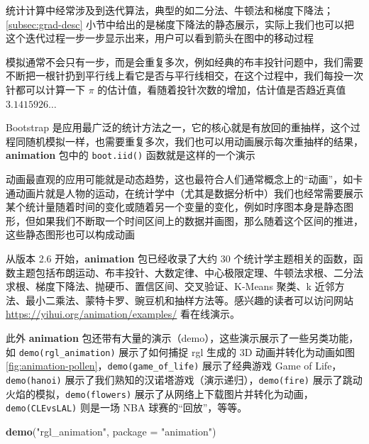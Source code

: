 \documentclass[
  b5paper,
  UTF8,twoside]{book}
\newenvironment{Shaded}{\begin{snugshade}}{\end{snugshade}}
\newcommand{\AttributeTok}[1]{\textcolor[rgb]{0.13,0.29,0.53}{#1}}
\newcommand{\FunctionTok}[1]{\textcolor[rgb]{0.13,0.29,0.53}{\textbf{#1}}}
\newcommand{\NormalTok}[1]{#1}
\newcommand{\StringTok}[1]{\textcolor[rgb]{0.31,0.60,0.02}{#1}}
\providecommand{\tightlist}{%
  \setlength{\itemsep}{0pt}\setlength{\parskip}{0pt}}
\begin{document}
\begin{description}
\tightlist
\item[迭代算法]
统计计算中经常涉及到迭代算法，典型的如二分法、牛顿法和梯度下降法；\ref{subsec:grad-desc} 小节中给出的是梯度下降法的静态展示，实际上我们也可以把这个迭代过程一步一步显示出来，用户可以看到箭头在图中的移动过程
\item[随机模拟]
模拟通常不会只有一步，而是会重复多次，例如经典的布丰投针问题中，我们需要不断把一根针扔到平行线上看它是否与平行线相交，在这个过程中，我们每投一次针都可以计算一下 \(\pi\) 的估计值，看随着投针次数的增加，估计值是否趋近真值 \(3.1415926\ldots\)
\item[重抽样]
Bootstrap 是应用最广泛的统计方法之一，它的核心就是有放回的重抽样，这个过程同随机模拟一样，也需要重复多次，我们也可以用动画展示每次重抽样的结果，\textbf{animation} 包中的 \texttt{boot.iid()} 函数就是这样的一个演示
\item[动态趋势]
动画最直观的应用可能就是动态趋势，这也最符合人们通常概念上的``动画''，如卡通动画片就是人物的运动，在统计学中（尤其是数据分析中）我们也经常需要展示某个统计量随着时间的变化或随着另一个变量的变化，例如时序图本身是静态图形，但如果我们不断取一个时间区间上的数据并画图，那么随着这个区间的推进，这些静态图形也可以构成动画
\end{description}

从版本 2.6 开始，\textbf{animation} 包已经收录了大约 30 个统计学主题相关的函数，函数主题包括布朗运动、布丰投针、大数定律、中心极限定理、牛顿法求根、二分法求根、梯度下降法、抛硬币、置信区间、交叉验证、K-Means 聚类、k 近邻方法、最小二乘法、蒙特卡罗、豌豆机和抽样方法等。感兴趣的读者可以访问网站 \url{https://yihui.org/animation/examples/} 看在线演示。

此外 \textbf{animation} 包还带有大量的演示（demo），这些演示展示了一些另类功能，如 \texttt{demo(\textquotesingle{}rgl\_animation\textquotesingle{})} 展示了如何捕捉 rgl 生成的 3D 动画并转化为动画如图 \ref{fig:animation-pollen}，\texttt{demo(\textquotesingle{}game\_of\_life\textquotesingle{})} 展示了经典游戏 Game of Life，\texttt{demo(\textquotesingle{}hanoi\textquotesingle{})} 展示了我们熟知的汉诺塔游戏（演示递归），\texttt{demo(\textquotesingle{}fire\textquotesingle{})} 展示了跳动火焰的模拟，\texttt{demo(\textquotesingle{}flowers\textquotesingle{})} 展示了从网络上下载图片并转化为动画，\texttt{demo(\textquotesingle{}CLEvsLAL\textquotesingle{})} 则是一场 NBA 球赛的``回放''，等等。

\begin{Shaded}
\begin{Highlighting}[]
\FunctionTok{demo}\NormalTok{(}\StringTok{"rgl\_animation"}\NormalTok{, }\AttributeTok{package =} \StringTok{"animation"}\NormalTok{)}
\end{Highlighting}
\end{Shaded}
\end{document}
